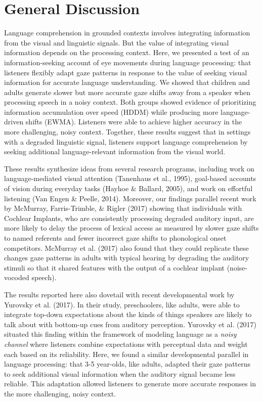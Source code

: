 \documentclass[10pt, letterpaper]{article}
\begin{document}
\section{General Discussion}\label{general-discussion}

Language comprehension in grounded contexts involves integrating
information from the visual and linguistic signals. But the value of
integrating visual information depends on the processing context. Here,
we presented a test of an information-seeking account of eye movements
during language processing: that listeners flexibly adapt gaze patterns
in response to the value of seeking visual information for accurate
language understanding. We showed that children and adults generate
slower but more accurate gaze shifts away from a speaker when processing
speech in a noisy context. Both groups showed evidence of prioritizing
information accumulation over speed (HDDM) while producing more
language-driven shifts (EWMA). Listeners were able to achieve higher
accuracy in the more challenging, noisy context. Together, these results
suggest that in settings with a degraded linguistic signal, listeners
support language comprehension by seeking additional language-relevant
information from the visual world.

These results synthesize ideas from several research programs, including
work on language-mediated visual attention (Tanenhaus et al., 1995),
goal-based accounts of vision during everyday tasks (Hayhoe \& Ballard,
2005), and work on effortful listening (Van Engen \& Peelle, 2014).
Moreover, our findings parallel recent work by McMurray, Farris-Trimble,
\& Rigler (2017) showing that individuals with Cochlear Implants, who
are consistently processing degraded auditory input, are more likely to
delay the process of lexical access as measured by slower gaze shifts to
named referents and fewer incorrect gaze shifts to phonological onset
competitors. McMurray et al. (2017) also found that they could replicate
these changes gaze patterns in adults with typical hearing by degrading
the auditory stimuli so that it shared features with the output of a
cochlear implant (noise-vocoded speech).

The results reported here also dovetail with recent developmental work
by Yurovsky et al. (2017). In their study, preschoolers, like adults,
were able to integrate top-down expectations about the kinds of things
speakers are likely to talk about with bottom-up cues from auditory
perception. Yurovsky et al. (2017) situated this finding within the
framework of modeling language as a \emph{noisy channel} where listeners
combine expectations with perceptual data and weight each based on its
reliability. Here, we found a similar developmental parallel in language
processing: that 3-5 year-olds, like adults, adapted their gaze patterns
to seek additional visual information when the auditory signal became
less reliable. This adaptation allowed listeners to generate more
accurate responses in the more challenging, noisy context.
\end{document}
